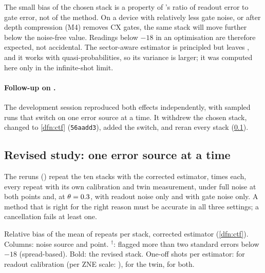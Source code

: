 \begin{rem}[Consequence]
  The small bias of the chosen stack is a property of 's ratio of readout
  error to gate error, not of the method. On a device with relatively less gate noise, or after
  depth compression (M4) removes CX gates, the same stack will move further below the
  noise-free value. Readings below $-18$ in an optimisation are therefore expected, not
  accidental. The sector-aware estimator is principled but leaves \VMxHvaZeroFullCtfRel, and it works with
  quasi-probabilities, so its variance is larger; it was computed here only in the
  infinite-shot limit.
\end{rem}

\paragraph{Follow-up on .} The development session reproduced both effects
independently, with sampled runs that switch on one error source at a time. It withdrew the
chosen stack, changed  to \cref{dfn:ctf} (\texttt{56aadd3}), added the
 switch, and reran every stack (\cref{sec:m2sources}).

\subsection{Revised study: one error source at a time}
\label{sec:m2sources}

The reruns () repeat the ten stacks with the corrected estimator,
\VMbRepeats{} times each, every repeat with its own calibration and twin measurement, under full noise at both points and, at $\theta=0.3$, with
readout noise only and with gate noise only. A method that is right for the right reason must
be accurate in all three settings; a cancellation fails at least one.

\begin{table}[H]
  \centering
  \footnotesize
  \setlength{\tabcolsep}{4pt}
  \begin{adjustbox}{max width=\linewidth}
    
  \end{adjustbox}
  \caption{Relative bias of the mean of \VMbRepeats{} repeats per stack, corrected estimator
    (\cref{dfn:ctf}). Columns: noise source and point. $^\dagger$: flagged more than two
    standard errors below $-18$ (spread-based). Bold: the revised stack. One-off shots per estimator:
    \VMbSetupRo{} for readout calibration (per ZNE scale: \VMbSetupRoZne), \VMbSetupTwin{} for the
    twin, \VMbSetupRoSymTwin{} for both.}
  \label{tab:m2b}
\end{table}

